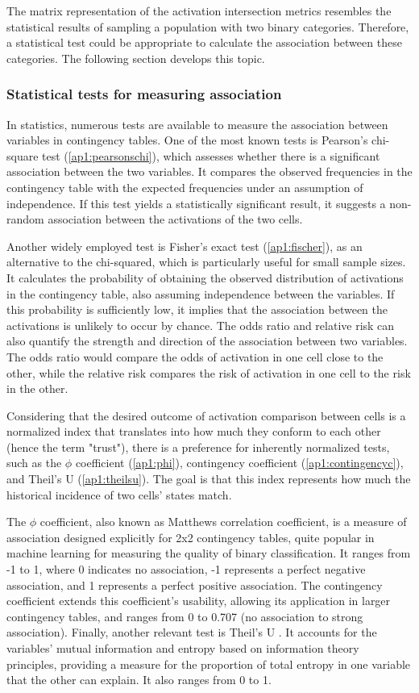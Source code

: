The matrix representation of the activation intersection metrics resembles the statistical results of sampling a population with two binary categories. Therefore, a statistical test could be appropriate to calculate the association between these categories. The following section develops this topic.

\subsubsection{Statistical tests for measuring association}

In statistics, numerous tests are available to measure the association between variables in contingency tables. One of the most known tests is Pearson's chi-square test (\ref{ap1:pearsonschi}), which assesses whether there is a significant association between the two variables. It compares the observed frequencies in the contingency table with the expected frequencies under an assumption of independence. If this test yields a statistically significant result, it suggests a non-random association between the activations of the two cells.

Another widely employed test is Fisher's exact test (\ref{ap1:fischer}), as an alternative to the chi-squared, which is particularly useful for small sample sizes. It calculates the probability of obtaining the observed distribution of activations in the contingency table, also assuming independence between the variables. If this probability is sufficiently low, it implies that the association between the activations is unlikely to occur by chance. The odds ratio and relative risk can also quantify the strength and direction of the association between two variables. The odds ratio would compare the odds of activation in one cell close to the other, while the relative risk compares the risk of activation in one cell to the risk in the other.

Considering that the desired outcome of activation comparison between cells is a normalized index that translates into how much they conform to each other (hence the term "trust"), there is a preference for inherently normalized tests, such as the $\phi$ coefficient (\ref{ap1:phi}), contingency coefficient (\ref{ap1:contingencyc}), and Theil's U (\ref{ap1:theilsu}). The goal is that this index represents how much the historical incidence of two cells' states match.

The $\phi$ coefficient, also known as Matthews correlation coefficient, is a measure of association designed explicitly for 2x2 contingency tables, quite popular in machine learning for measuring the quality of binary classification. It ranges from -1 to 1, where 0 indicates no association, -1 represents a perfect negative association, and 1 represents a perfect positive association. The contingency coefficient extends this coefficient's usability, allowing its application in larger contingency tables, and ranges from 0 to 0.707 (no association to strong association).
Finally, another relevant test is Theil's U . It accounts for the variables' mutual information and entropy based on information theory principles, providing a measure for the proportion of total entropy in one variable that the other can explain. It also ranges from 0 to 1.

